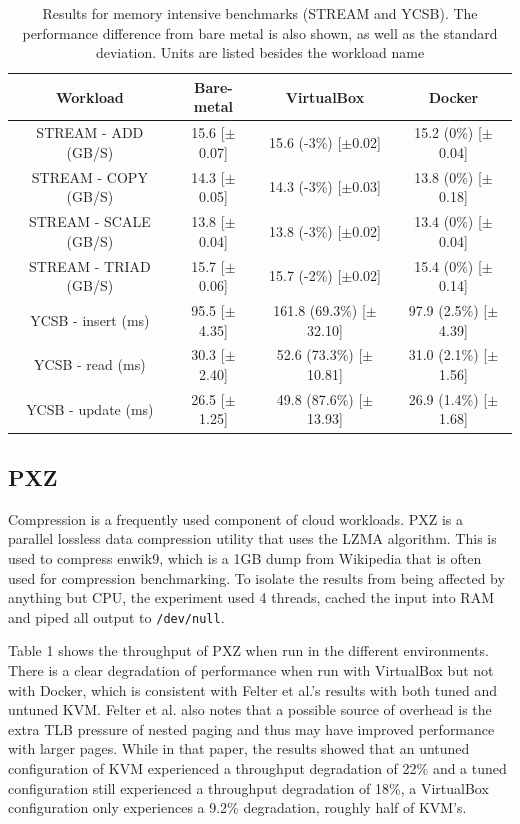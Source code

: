 \documentclass{sig-alternate-10pt}
\begin{document}
\begin{table}
\centering
\begin{tabular}{|c|c|c|c|} \hline
Workload & Bare-metal & VirtualBox & Docker \\ \hline
STREAM - ADD (GB/S) & 15.6 [$\pm$0.07] & 15.6 (-3\%) [$\pm$0.02] & 15.2 (0\%) [$\pm$0.04] \\ \hline
STREAM - COPY (GB/S) & 14.3 [$\pm$0.05] & 14.3 (-3\%) [$\pm$0.03] & 13.8 (0\%) [$\pm$0.18] \\ \hline 
STREAM - SCALE (GB/S) & 13.8 [$\pm$0.04] & 13.8 (-3\%) [$\pm$0.02] & 13.4 (0\%) [$\pm$0.04] \\ \hline
STREAM - TRIAD (GB/S) & 15.7 [$\pm$0.06] & 15.7 (-2\%) [$\pm$0.02] & 15.4 (0\%) [$\pm$0.14] \\ \hline
YCSB - insert (ms) & 95.5 [$\pm$4.35] & 161.8 (69.3\%) [$\pm$32.10] & 97.9 (2.5\%) [$\pm$4.39] \\ \hline
YCSB - read (ms) & 30.3 [$\pm$2.40] & 52.6 (73.3\%) [$\pm$10.81] & 31.0 (2.1\%) [$\pm$1.56] \\ \hline
YCSB - update (ms) & 26.5 [$\pm$1.25] & 49.8 (87.6\%) [$\pm$13.93] & 26.9 (1.4\%) [$\pm$1.68] \\
\hline\end{tabular}
\captionsetup{justification=centering}
\caption{Results for memory intensive benchmarks (STREAM and YCSB). The performance difference from bare metal is also shown, as well as the standard deviation. Units are listed besides the workload name}
\end{table}

\subsection{PXZ}
Compression is a frequently used component of cloud workloads\cite{felter:2014}. PXZ\cite{pxz} is a parallel lossless data compression utility that uses the LZMA algorithm. This is used to compress enwik9\cite{enwik}, which is a 1GB dump from Wikipedia that is often used for compression benchmarking\cite{felter:2014}. To isolate the results from being affected by anything but CPU, the experiment used 4 threads, cached the input into RAM and piped all output to \texttt{/dev/null}.

Table 1 shows the throughput of PXZ when run in the different environments. There is a clear degradation of performance when run with VirtualBox but not with Docker, which is consistent with Felter et al.'s results with both tuned and untuned KVM. Felter et al. also notes that a possible source of overhead is the extra TLB pressure of nested paging and thus may have improved performance with larger pages\cite{felter:2014}. While in that paper, the results showed that an untuned configuration of KVM experienced a throughput degradation of 22\% and a tuned configuration still experienced a throughput degradation of 18\%, a VirtualBox configuration only experiences a 9.2\% degradation, roughly half of KVM's.
\end{document}
